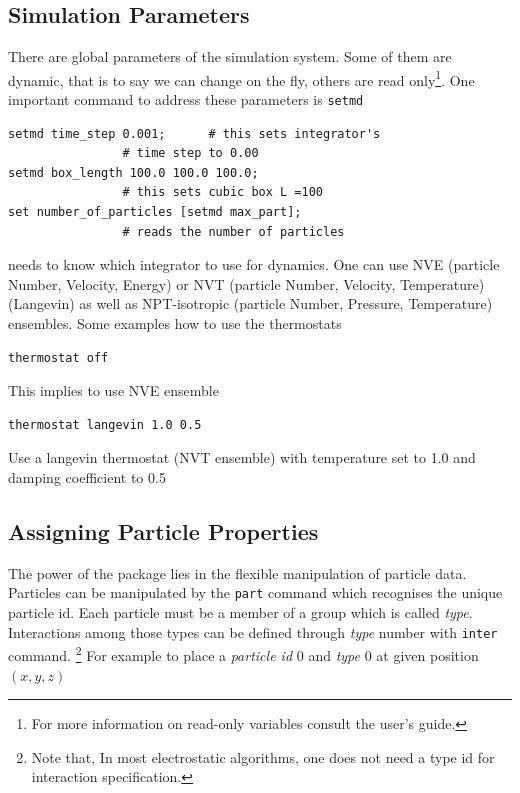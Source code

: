 \documentclass[
paper=a4,                       %
fontsize=11pt,                  %
twoside,                        %
footsepline,                    %
headsepline,                    %
headinclude=false,              %
footinclude=false,              %
pagesize,                       %
]{scrartcl}
\begin{document}
 \subsection{Simulation Parameters}
  There are global parameters of the simulation system. Some of them are
  dynamic, that is to say we can change on the fly, others are read only\footnote{For
  more information on read-only variables consult the user's guide.}. One
  important \es{} command to address these parameters is \lstinline|setmd|
  
  {\small\vspace{0,2cm}
\begin{lstlisting}[numbers=none]
setmd time_step 0.001;		# this sets integrator's
				# time step to 0.00
setmd box_length 100.0 100.0 100.0;
				# this sets cubic box L =100
set number_of_particles [setmd max_part];
				# reads the number of particles
\end{lstlisting}\vspace{0,2cm}
} 

\es{} needs to know which integrator to use for dynamics. One can use NVE (particle Number, Velocity, Energy) or NVT (particle Number, Velocity, Temperature)(Langevin) as well as NPT-isotropic (particle Number, Pressure, Temperature) ensembles. Some examples how to use the thermostats

{\small\vspace{0,2cm}
\begin{lstlisting}[numbers=none]
thermostat off
\end{lstlisting}}\vspace{0,2cm}
\noindent This implies to use NVE ensemble
{\small\vspace{0,2cm}
\begin{lstlisting}[numbers=none]
thermostat langevin 1.0 0.5
\end{lstlisting}}\vspace{0,2cm}
\noindent Use a langevin thermostat (NVT ensemble) with temperature set to 1.0 and damping coefficient to 0.5 



\subsection{Assigning Particle Properties}\label{sec:partprop}
The power of the \es{} package lies in the flexible manipulation of particle
data. Particles can be manipulated by the \lstinline|part| command which recognises the unique particle 
   id. Each particle must be a member of a group which is called \emph{type}. 
Interactions among those types can be defined through \emph{type} number 
   with \lstinline|inter| command.
   \footnote{Note that, In most electrostatic algorithms, one does not need a type id for interaction specification.}
   For example to place a \emph{particle id} 0 and \emph{type} 0 at given 
   position $(x,y,z)$
   
\end{document}
